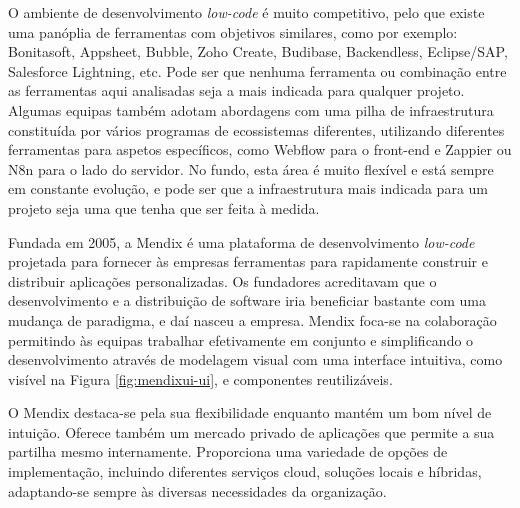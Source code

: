     O ambiente de desenvolvimento \textit{low-code} é muito competitivo, pelo que existe uma panóplia de ferramentas com objetivos similares, como por exemplo: Bonitasoft, Appsheet, Bubble, Zoho Create, Budibase, Backendless, Eclipse/SAP, Salesforce Lightning, etc. Pode ser que nenhuma ferramenta ou combinação entre as ferramentas aqui analisadas seja a mais indicada para qualquer projeto. Algumas equipas também adotam abordagens com uma pilha de infraestrutura constituída por vários programas de ecossistemas diferentes, utilizando diferentes ferramentas para aspetos específicos, como Webflow para o front-end e Zappier ou N8n para o lado do servidor. No fundo, esta área é muito flexível e está sempre em constante evolução, e pode ser que a infraestrutura mais indicada para um projeto seja uma que tenha que ser feita à medida.
        


    \label{secsecsec:mendix}
        
        Fundada em 2005, a Mendix é uma plataforma de desenvolvimento \textit{low-code} projetada para fornecer às empresas ferramentas para rapidamente construir e distribuir aplicações personalizadas. Os fundadores acreditavam que o desenvolvimento e a distribuição de software iria beneficiar bastante com uma mudança de paradigma, e daí nasceu a empresa. Mendix foca-se na colaboração permitindo às equipas trabalhar efetivamente em conjunto e simplificando o desenvolvimento através de modelagem visual com uma interface intuitiva, como visível na Figura \ref{fig:mendixui-ui}, e componentes reutilizáveis\cite{why-was-mendix-founded}.

        O Mendix destaca-se pela sua flexibilidade enquanto mantém um bom nível de intuição. Oferece também um mercado privado de aplicações que permite a sua partilha mesmo internamente. Proporciona uma variedade de opções de implementação, incluindo diferentes serviços cloud, soluções locais e híbridas, adaptando-se sempre às diversas necessidades da organização\cite{outsystems-vs-mendix}.

